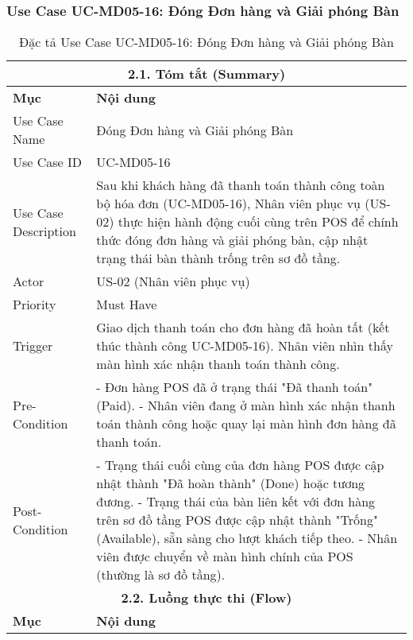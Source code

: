 \subsubsection{Use Case UC-MD05-16: Đóng Đơn hàng và Giải phóng Bàn}
\begin{longtable}{|m{4cm}|p{11cm}|}
\caption{Đặc tả Use Case UC-MD05-16: Đóng Đơn hàng và Giải phóng Bàn} \label{tab:uc_md05_16_final} \\
\hline
\multicolumn{2}{|c|}{\textbf{2.1. Tóm tắt (Summary)}} \\
\hline
\textbf{Mục} & \textbf{Nội dung} \\
\hline
\endhead %
\hline
\endfoot %
\hline
\endlastfoot %
Use Case Name & Đóng Đơn hàng và Giải phóng Bàn \\
\hline
Use Case ID & UC-MD05-16 \\
\hline
Use Case Description & Sau khi khách hàng đã thanh toán thành công toàn bộ hóa đơn (UC-MD05-16), Nhân viên phục vụ (US-02) thực hiện hành động cuối cùng trên POS để chính thức đóng đơn hàng và giải phóng bàn, cập nhật trạng thái bàn thành trống trên sơ đồ tầng. \\
\hline
Actor & US-02 (Nhân viên phục vụ) \\
\hline
Priority & Must Have \\
\hline
Trigger & Giao dịch thanh toán cho đơn hàng đã hoàn tất (kết thúc thành công UC-MD05-16). Nhân viên nhìn thấy màn hình xác nhận thanh toán thành công. \\
\hline
Pre-Condition & - Đơn hàng POS đã ở trạng thái "Đã thanh toán" (Paid). \newline - Nhân viên đang ở màn hình xác nhận thanh toán thành công hoặc quay lại màn hình đơn hàng đã thanh toán. \\
\hline
Post-Condition & - Trạng thái cuối cùng của đơn hàng POS được cập nhật thành "Đã hoàn thành" (Done) hoặc tương đương. \newline - Trạng thái của bàn liên kết với đơn hàng trên sơ đồ tầng POS được cập nhật thành "Trống" (Available), sẵn sàng cho lượt khách tiếp theo. \newline - Nhân viên được chuyển về màn hình chính của POS (thường là sơ đồ tầng). \\
\hline
\multicolumn{2}{|c|}{\textbf{2.2. Luồng thực thi (Flow)}} \\
\hline
\textbf{Mục} & \textbf{Nội dung} \\

\end{longtable}
